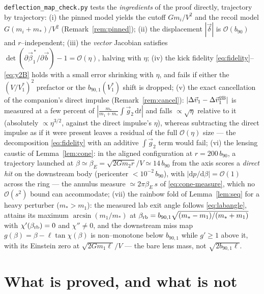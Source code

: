 \documentclass[11pt]{article}
\newcommand{\dd}{\mathrm{d}}
\newcommand{\bv}{\vec b}
\newcommand{\bnt}{b_{90}}
\newcommand{\order}[1]{\mathcal O\!\left(#1\right)}
\begin{document}
\texttt{deflection\_map\_check.py} tests the \emph{ingredients} of the proof directly, trajectory
by trajectory: (i) the pinned model
yields the cutoff $Gm_i/V^2$ and the recoil model $G(m_i+m_*)/V^2$ (Remark~\ref{rem:pinned});
(ii) the displacement $|\vec\delta|$ is $\order\bnt$ and $r$--independent; (iii) the \emph{vector}
Jacobian satisfies $\det(\partial\vec\beta_1^{\,*}/\partial\bv)-1=\order\eta$, halving with $\eta$;
(iv) the kick fidelity \eqref{eq:fidelity}--\eqref{eq:y2B} holds with a small error shrinking with
$\eta$, and fails if either the $(V/V_1^*)^2$ prefactor or the $b_{90,1}(V_1^*)$ shift is dropped;
(v) the exact cancellation of the companion's direct impulse (Remark~\ref{rem:cancel}):
$|\Delta\vec v_1-\Delta\vec v_1^{\rm 2B}|$ is measured at a few percent of
$|\frac{m_*}{m_1+m_*}\int\vec g_2\,\dd t|$ and falls $\propto\sqrt\eta$ relative to it (absolutely
$\propto\eta^{3/2}$, against the direct impulse's $\eta$), whereas subtracting the direct impulse
as if it were present leaves a residual of the full $\order\eta$ size --- the decomposition
\eqref{eq:fidelity} with an additive $\int\vec g_2$ term would fail;
(vi) the lensing caustic of Lemma~\ref{lem:cone}: in the aligned configuration at $r=200\,b_{90}$,
a trajectory launched at $\beta\simeq\beta_E=\sqrt{2Gm_2r}/V\simeq14\,b_{90}$ from the axis scores
a \emph{direct hit} on the downstream body (pericenter $<10^{-2}\,b_{90}$), with
$|\dd p/\dd\beta|=\order 1$ across the ring --- the annulus measure $\simeq2\pi\beta_E\,s$ of
\eqref{eq:cone-measure}, which no $\order{s^2}$ bound can accommodate;
(vii) the rainbow fold of Lemma~\ref{lem:seq} for a heavy perturber ($m_*>m_1$): the measured lab
exit angle follows \eqref{eq:labangle}, attains its maximum $\arcsin(m_1/m_*)$ at
$\beta_{\rm rb}=b_{90,1}\sqrt{(m_*-m_1)/(m_*+m_1)}$ with $\chi'(\beta_{\rm rb})=0$ and
$\chi''\neq0$, and the downstream miss map $g(\beta)=\beta-\ell\tan\chi(\beta)$ is non--monotone
below $b_{90,1}$ while $g'\ge1$ above it, with its Einstein zero at $\sqrt{2Gm_1\ell}/V$ --- the
bare lens mass, not $\sqrt{2b_{90,1}\ell}$.

\section{What is proved, and what is not}
\label{sec:summary}
\end{document}
